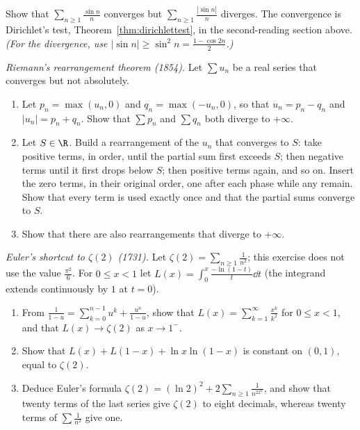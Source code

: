 \begin{exercise}[$\star\star$]\label{ex:sinn}
Show that $\sum_{n\ge1}\frac{\sin n}n$ converges but $\sum_{n\ge1}\frac{|\sin n|}n$ diverges. The convergence is Dirichlet's test, Theorem~\ref{thm:dirichlettest}, in the second-reading section above. \emph{(For the divergence, use $|\sin n|\ge\sin^2n=\frac{1-\cos2n}2$.)}
\end{exercise}

\begin{exercise}[$\star\star\star$]\label{ex:riemannrearr}
\emph{Riemann's rearrangement theorem (1854).} Let $\sum u_n$ be a real series that converges but not absolutely.
\begin{enumerate}[label=(\alph*)]
\item Let $p_n=\max(u_n,0)$ and $q_n=\max(-u_n,0)$, so that $u_n=p_n-q_n$ and $|u_n|=p_n+q_n$. Show that $\sum p_n$ and $\sum q_n$ both diverge to $+\infty$.
\item Let $S\in\R$. Build a rearrangement of the $u_n$ that converges to $S$: take positive terms, in order, until the partial sum first exceeds $S$; then negative terms until it first drops below $S$; then positive terms again, and so on. Insert the zero terms, in their original order, one after each phase while any remain. Show that every term is used exactly once and that the partial sums converge to $S$.
\item Show that there are also rearrangements that diverge to $+\infty$.
\end{enumerate}
\end{exercise}

\begin{exercise}[$\star\star\star$]\label{ex:eulerbasel}
\emph{Euler's shortcut to $\zeta(2)$ (1731).} Let $\zeta(2)=\sum_{n\ge1}\frac1{n^2}$; this exercise does not use the value $\frac{\pi^2}6$. For $0\le x<1$ let
$L(x)=\displaystyle\int_0^x\frac{-\ln(1-t)}t\dd t$ (the integrand extends continuously by $1$ at $t=0$).
\begin{enumerate}[label=(\alph*)]
\item From $\frac1{1-u}=\sum_{k=0}^{n-1}u^k+\frac{u^n}{1-u}$, show that $L(x)=\sum_{k=1}^\infty\frac{x^k}{k^2}$ for $0\le x<1$, and that $L(x)\to\zeta(2)$ as $x\to1^-$.
\item Show that $L(x)+L(1-x)+\ln x\ln(1-x)$ is constant on $(0,1)$, equal to $\zeta(2)$.
\item Deduce Euler's formula $\zeta(2)=(\ln2)^2+2\sum_{n\ge1}\frac1{n^22^n}$, and show that twenty terms of the last series give $\zeta(2)$ to eight decimals, whereas twenty terms of $\sum\frac1{n^2}$ give one.
\end{enumerate}
\end{exercise}

